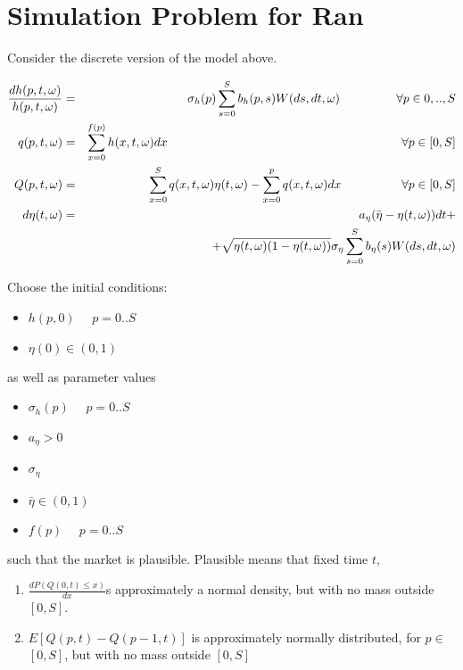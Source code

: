 \documentclass{article}
\begin{document}
\section{Simulation Problem for Ran}

Consider the discrete version of the model above.

\begin{eqnarray}
\frac{dh(p,t,\omega )}{h(p,t,\omega )} &=&\sigma
_{h}(p)\sum_{s=0}^{S}b_{h}(p,s)W(ds,dt,\omega )\text{ \ \ \ \ \ \ \ \ \ \ \ }%
\forall p\in 0,..,S \\
q(p,t,\omega ) &=&\sum_{x=0}^{f(p)}h(x,t,\omega )dx\text{ \ \ \ \ \ \ \ \ \
\ \ \ \ \ \ \ \ \ \ \ \ \ \ \ \ \ \ \ \ \ \ \ \ \ \ \ \ \ \ \ \ \ \ \ \ \ \
\ \ \ \ \ \ \ \ }\forall p\in \lbrack 0,S] \\
Q(p,t,\omega ) &=&\sum_{x=0}^{S}q(x,t,\omega )\eta (t,\omega
)-\sum_{x=0}^{p}q(x,t,\omega )dx\text{ \ \ \ \ \ \ \ \ \ \ \ \ }\forall p\in
\lbrack 0,S] \\
d\eta (t,\omega ) &=&a_{\eta }(\bar{\eta}-\eta (t,\omega ))dt+ \\
&&+\sqrt{\eta (t,\omega )(1-\eta (t,\omega ))}\sigma _{\eta
}\sum_{s=0}^{S}b_{\eta }(s)W(ds,dt,\omega )
\end{eqnarray}

Choose the initial conditions:

\begin{itemize}
\item $h(p,0)$ \ \ $p=0..S$

\item $\eta (0)\in (0,1)$
\end{itemize}

as well as parameter values

\begin{itemize}
\item $\sigma _{h}(p)$ \ \ $p=0..S$

\item $a_{\eta }>0$

\item $\sigma _{\eta }$

\item $\bar{\eta}\in (0,1)$

\item $f(p)$ \ \ $p=0..S$
\end{itemize}

such that the market is plausible. Plausible means that fixed time $t$,

\begin{enumerate}
\item $\frac{dP(Q(0,t)\leq x)}{dx}$s approximately a normal density, but
with no mass outside $[0,S]$.

\item $E[Q(p,t)-Q(p-1,t)]$ is approximately normally distributed, for $p\in $
$[0,S]$, but with no mass outside $[0,S]$
\end{enumerate}
\end{document}
